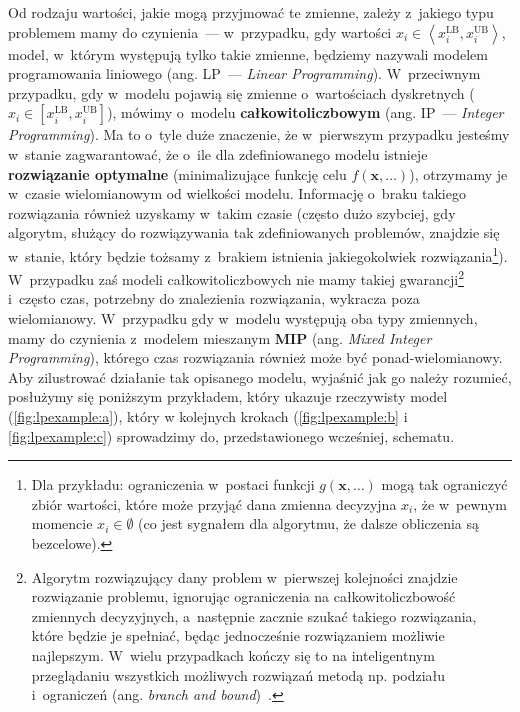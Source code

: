 Od rodzaju wartości, jakie mogą przyjmować te zmienne, zależy z~jakiego typu problemem mamy do czynienia~--- w~przypadku, gdy wartości $x_{i} \in \left\langle x_{i}^{\textrm{LB}}, x_{i}^{\textrm{UB}} \right\rangle$, model, w~którym występują tylko takie zmienne, będziemy nazywali modelem programowania liniowego (ang. \textsc{LP}~--- \textit{Linear Programming}).
W~przeciwnym przypadku, gdy w~modelu pojawią się zmienne o~wartościach dyskretnych ($x_{i} \in \left[ x_{i}^{\textrm{LB}}, x_{i}^{\textrm{UB}} \right]$), mówimy o~modelu \textbf{całkowitoliczbowym} (ang. \textsc{IP}~--- \textit{Integer Programming}).
Ma to o~tyle duże znaczenie, że w~pierwszym przypadku jesteśmy w~stanie zagwarantować, że o~ile dla zdefiniowanego modelu istnieje \textbf{rozwiązanie optymalne} (minimalizujące funkcję celu $f \left( \textbf{x}, \dots \right)$), otrzymamy je w~czasie wielomianowym od wielkości modelu.
Informację o~braku takiego rozwiązania również uzyskamy w~takim czasie (często dużo szybciej, gdy algorytm, służący do rozwiązywania tak zdefiniowanych problemów, znajdzie się w~stanie, który będzie tożsamy z~brakiem istnienia jakiegokolwiek rozwiązania\footnote{
	Dla przykładu: ograniczenia w~postaci funkcji $g \left( \textbf{x}, \dots \right)$ mogą tak ograniczyć zbiór wartości, które może przyjąć dana zmienna decyzyjna $x_{i}$, że w~pewnym momencie $x_{i} \in \emptyset$ (co jest sygnałem dla algorytmu, że dalsze obliczenia są bezcelowe).
}).
W~przypadku zaś modeli całkowitoliczbowych nie mamy takiej gwarancji\footnote{
	Algorytm rozwiązujący dany problem w~pierwszej kolejności znajdzie rozwiązanie problemu, ignorując ograniczenia na całkowitoliczbowość zmiennych decyzyjnych, a~następnie zacznie szukać takiego rozwiązania, które będzie je spełniać, będąc jednocześnie rozwiązaniem możliwie najlepszym.
	W~wielu przypadkach kończy się to na inteligentnym przeglądaniu wszystkich możliwych rozwiązań metodą np. podziału i~ograniczeń (ang. \textit{branch and bound})~\cite[$433$--$448$]{Papadimitriou:1982:COA:31027}.
} i~często czas, potrzebny do znalezienia rozwiązania, wykracza poza wielomianowy.
W~przypadku gdy w~modelu występują oba typy zmiennych, mamy do czynienia z~modelem mieszanym \textbf{MIP} (ang. \textit{Mixed Integer Programming}), którego czas rozwiązania również może być ponad-wielomianowy.
Aby zilustrować działanie tak opisanego modelu, wyjaśnić jak go należy rozumieć, posłużymy się poniższym przykładem, który ukazuje rzeczywisty model (\ref{fig:lpexample:a}), który w kolejnych krokach (\ref{fig:lpexample:b} i \ref{fig:lpexample:c}) sprowadzimy do, przedstawionego wcześniej, schematu.

